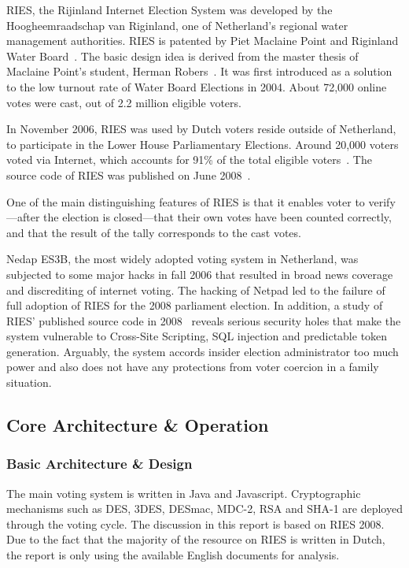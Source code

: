 RIES, the Rijinland Internet Election System was developed by the Hoogheemraadschap van Riginland, one of Netherland's regional water management authorities. RIES is patented by Piet Maclaine Point and Riginland Water Board~\cite{hubbers2004}. The basic design idea is derived from the master thesis of Maclaine Point's student, Herman Robers~\cite{robers1998}. It was first introduced as a solution to the low turnout rate of Water Board Elections in 2004. About 72,000 online votes were cast, out of 2.2 million eligible voters.

In November 2006, RIES was used by Dutch voters reside outside of Netherland, to participate in the Lower House Parliamentary Elections. Around 20,000 voters voted via Internet, which accounts for 91\% of the total eligible voters~\cite{competence2014}. The source code of RIES was published on June 2008~\cite{gonggrijp2009}.

One of the main distinguishing features of RIES is that it enables voter to verify---after the election is closed---that their own votes have been counted correctly, and that the result of the tally corresponds to the cast votes.

Nedap ES3B, the most widely adopted voting system in Netherland, was subjected to some major hacks in fall 2006 that resulted in broad news coverage and discrediting of internet voting. The hacking of Netpad led to the failure of full adoption of RIES for the 2008 parliament election. In addition, a study of RIES' published source code in 2008~\cite{gonggrijp2009} reveals serious security holes that make the system vulnerable to Cross-Site Scripting, SQL injection and predictable token generation. Arguably, the system accords insider election administrator too much power and also does not have any protections from voter coercion in a family situation.

\subsection{Core Architecture \& Operation}

\subsubsection{Basic Architecture \& Design}

The main voting system is written in Java and Javascript. Cryptographic mechanisms such as DES, 3DES, DESmac, MDC-2, RSA and SHA-1 are deployed through the voting cycle. The discussion in this report is based on RIES 2008. Due to the fact that the majority of the resource on RIES is written in Dutch, the report is only using the available English documents for analysis.

